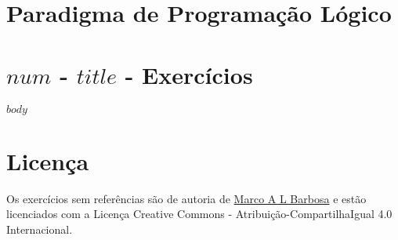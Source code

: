\documentclass[a4paper,11pt]{article}
\begin{document}
\pagestyle{empty}

\section{Paradigma de Programação Lógico}

\section{$num$ - $title$ - Exercícios}

$body$

\section{Licença}

\begin{center}
Os exercícios sem referências são de autoria de \href{malbarbo.pro.br}{Marco A
L Barbosa} e estão licenciados com a Licença Creative Commons -
Atribuição-CompartilhaIgual 4.0 Internacional.

\href{http://creativecommons.org/licenses/by-sa/4.0/}{\ccbysa}
\end{center}
\end{document}
